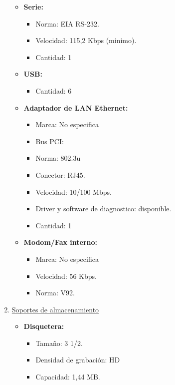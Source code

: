 \begin{enumerate}
\begin{itemize}
    \item \textbf{Serie:}
    \begin{itemize}
      \item Norma: EIA RS-232.
      \item Velocidad: 115,2 Kbps (minimo).
      \item Cantidad: 1
    \end{itemize}
    
    \item \textbf{USB:}
    \begin{itemize}
      \item Cantidad: 6
    \end{itemize}
    
    \item \textbf{Adaptador de LAN Ethernet:}
    \begin{itemize}
      \item Marca: No especifica
      \item Bus PCI: 
      \item Norma: 802.3u
      \item Conector: RJ45.
      \item Velocidad: 10/100 Mbps.
      \item Driver y software de diagnostico: disponible.
      \item Cantidad: 1
    \end{itemize}
       
    \item \textbf{Modom/Fax interno:}
    \begin{itemize}
      \item Marca: No especifica
      \item Velocidad: 56 Kbps.
      \item Norma: V92.
    \end{itemize}
  \end{itemize}
    
  \item \underline{Soportes de almacenamiento}
  \begin{itemize}
    \item \textbf{Disquetera:}
    \begin{itemize}
      \item Tamaño: 3 1/2.
      \item Densidad de grabación: HD
      \item Capacidad: 1,44 MB.
    \end{itemize}
    

\end{itemize}
\end{enumerate}
